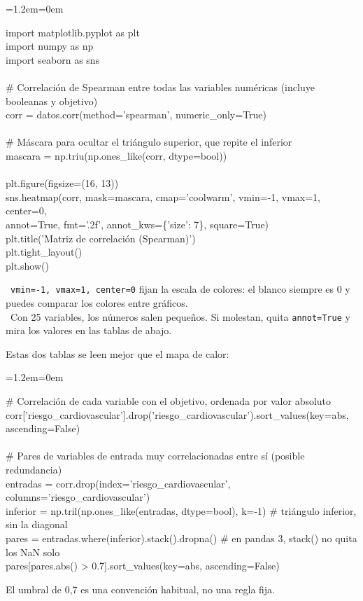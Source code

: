 \documentclass[11pt,a4paper]{article}
\newenvironment{codigo}
  {\par\smallskip\begin{list}{}{\leftmargin=1.2em\rightmargin=0em}\item\relax\ttfamily\scriptsize\raggedright}
  {\end{list}\smallskip}
\begin{document}
{\begin{codigo}
import matplotlib.pyplot as plt \\{}
import numpy as np \\{}
import seaborn as sns \\{}
\mbox{} \\{}
\# Correlación de Spearman entre todas las variables numéricas (incluye booleanas y objetivo) \\{}
corr = datos.corr(method='spearman', numeric\_\allowbreak{}only=True) \\{}
\mbox{} \\{}
\# Máscara para ocultar el triángulo superior, que repite el inferior \\{}
mascara = np.triu(np.ones\_\allowbreak{}like(corr, dtype=bool)) \\{}
\mbox{} \\{}
plt.figure(figsize=(16, 13)) \\{}
sns.heatmap(corr, mask=mascara, cmap='coolwarm', vmin=-1, vmax=1, center=0, \\{}
\hspace*{6.24em}annot=True, fmt='.2f', annot\_\allowbreak{}kws=\{'size': 7\}, square=True) \\{}
plt.title('Matriz de correlación (Spearman)') \\{}
plt.tight\_\allowbreak{}layout() \\{}
plt.show()
\end{codigo}
\hspace*{1.0em}\textbullet~\texttt{vmin=-1, vmax=1, center=0} fijan la escala de colores: el blanco siempre es 0 y puedes comparar los colores entre gráficos. \\{}
\hspace*{1.0em}\textbullet~Con 25 variables, los números salen pequeños. Si molestan, quita \texttt{annot=True} y mira los valores en las tablas de abajo.

Estas dos tablas se leen mejor que el mapa de calor:

\begin{codigo}
\# Correlación de cada variable con el objetivo, ordenada por valor absoluto \\{}
corr['riesgo\_\allowbreak{}cardiovascular'].drop('riesgo\_\allowbreak{}cardiovascular').sort\_\allowbreak{}values(key=abs, ascending=False) \\{}
\mbox{} \\{}
\# Pares de variables de entrada muy correlacionadas entre sí (posible redundancia) \\{}
entradas = corr.drop(index='riesgo\_\allowbreak{}cardiovascular', columns='riesgo\_\allowbreak{}cardiovascular') \\{}
inferior = np.tril(np.ones\_\allowbreak{}like(entradas, dtype=bool), k=-1)  \# triángulo inferior, sin la diagonal \\{}
pares = entradas.where(inferior).stack().dropna()  \# en pandas 3, stack() no quita los NaN solo \\{}
pares[pares.abs() \textgreater{} 0.7].sort\_\allowbreak{}values(key=abs, ascending=False)
\end{codigo}
El umbral de 0,7 es una convención habitual, no una regla fija.

}
\end{document}
